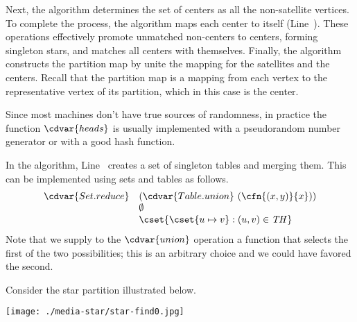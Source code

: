 \begin{group}
\begin{algorithm}
Next, the algorithm determines the set of centers as all the
non-satellite vertices.
%
To complete the process, the algorithm maps each center to itself
(Line~\linegcstarself{}).
%
These operations effectively promote unmatched non-centers to centers,
forming singleton stars, and matches all centers with themselves.
%
Finally, the algorithm constructs the partition map by unite the
mapping for the satellites and the centers.
%
Recall that the partition map is a mapping from each vertex to the
representative vertex of its partition, which in this case is the
center.
\end{algorithm}

\begin{note}
Since most machines don't have true sources of randomness, in practice
the function $\cdvar{heads}$ is usually implemented with a
pseudorandom number generator or with a good hash function.

In the algorithm, Line~\linegcstarmerge{} creates a set of
singleton tables and merging them.
%
This can be implemented using sets and tables as follows.
%
\[
\begin{array}{ll}
  \cdvar{Set.reduce}
  & (\cdvar{Table.union}~(\cfn{(x,y)}{x}))
\\
& \emptyset
\\
& \cset{\cset{u \mapsto v} : (u,v) \in \mathit{TH}}
\end{array}
\]
Note that we supply to the $\cdvar{union}$ operation a function that selects the first of the two possibilities; this is an arbitrary choice and we could have favored the second.

\end{note}

\begin{example}
Consider the star partition illustrated below.
\begin{center}
  \texttt{[image: ./media-star/star-find0.jpg]}
\end{center}


\end{example}
\end{group}
